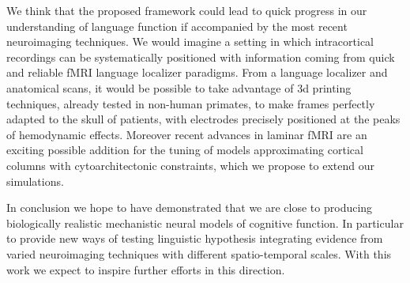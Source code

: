 \documentclass[10pt]{article}
\begin{document}
We think that the proposed framework could lead to quick progress in our understanding of language function if accompanied by the most recent neuroimaging techniques.
We would imagine a setting in which intracortical recordings can be systematically positioned with information coming from quick and reliable fMRI language localizer paradigms\cite{mahowald2016reliable}.
From a language localizer and anatomical scans, it would be possible to take advantage of 3d printing techniques, already tested in non-human primates\cite{chen20173d}, to make frames perfectly adapted to the skull of patients, with electrodes precisely positioned at the peaks of hemodynamic effects.
Moreover recent advances in laminar fMRI\cite{lawrence2017laminar} are an exciting possible addition for the tuning of models approximating cortical columns with cytoarchitectonic constraints, which we propose to extend our simulations.

In conclusion we hope to have demonstrated that we are close to producing biologically realistic mechanistic neural models of cognitive function.
In particular to provide new ways of testing linguistic hypothesis integrating evidence from varied neuroimaging techniques with different spatio-temporal scales.
With this work we expect to inspire further efforts in this direction.




\end{document}
